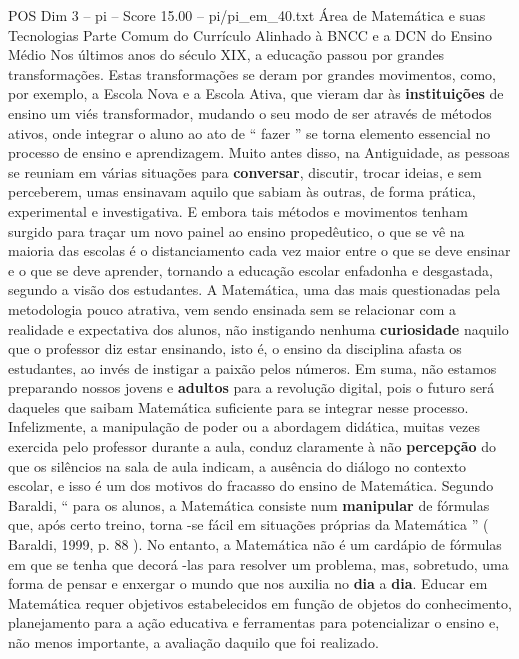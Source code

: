 \begin{textsample}{POS Dim 3 – pi – Score 15.00 – pi/pi\_em\_40.txt}  \label{ex:f3_pos_255}
Área de Matemática e suas Tecnologias Parte Comum do Currículo Alinhado à BNCC e a DCN do Ensino Médio Nos últimos anos do século XIX, a educação passou por grandes transformações.
Estas transformações se deram por grandes movimentos, como, por exemplo, a Escola Nova e a Escola Ativa, que vieram dar às \textbf{instituições} de ensino um viés transformador, mudando o seu modo de ser através de métodos ativos, onde integrar o aluno ao ato de “ fazer ” se torna elemento essencial no processo de ensino e aprendizagem.
Muito antes disso, na Antiguidade, as pessoas se reuniam em várias situações para \textbf{conversar}, discutir, trocar ideias, e sem perceberem, umas ensinavam aquilo que sabiam às outras, de forma prática, experimental e investigativa.
E embora tais métodos e movimentos tenham surgido para traçar um novo painel ao ensino propedêutico, o que se vê na maioria das escolas é o distanciamento cada vez maior entre o que se deve ensinar e o que se deve aprender, tornando a educação escolar enfadonha e desgastada, segundo a visão dos estudantes.
A Matemática, uma das mais questionadas pela metodologia pouco atrativa, vem sendo ensinada sem se relacionar com a realidade e expectativa dos alunos, não instigando nenhuma \textbf{curiosidade} naquilo que o professor diz estar ensinando, isto é, o ensino da disciplina afasta os estudantes, ao invés de instigar a paixão pelos números.
Em suma, não estamos preparando nossos jovens e \textbf{adultos} para a revolução digital, pois o futuro será daqueles que saibam Matemática suficiente para se integrar nesse processo.
Infelizmente, a manipulação de poder ou a abordagem didática, muitas vezes exercida pelo professor durante a aula, conduz claramente à não \textbf{percepção} do que os silêncios na sala de aula indicam, a ausência do diálogo no contexto escolar, e isso é um dos motivos do fracasso do ensino de Matemática.
Segundo Baraldi, “ para os alunos, a Matemática consiste num \textbf{manipular} de fórmulas que, após certo treino, torna -se fácil em situações próprias da Matemática ” ( Baraldi, 1999, p. 88 ).
No entanto, a Matemática não é um cardápio de fórmulas em que se tenha que decorá -las para resolver um problema, mas, sobretudo, uma forma de pensar e enxergar o mundo que nos auxilia no \textbf{dia} a \textbf{dia}.
Educar em Matemática requer objetivos estabelecidos em função de objetos do conhecimento, planejamento para a ação educativa e ferramentas para potencializar o ensino e, não menos importante, a avaliação daquilo que foi realizado.

\end{textsample}
